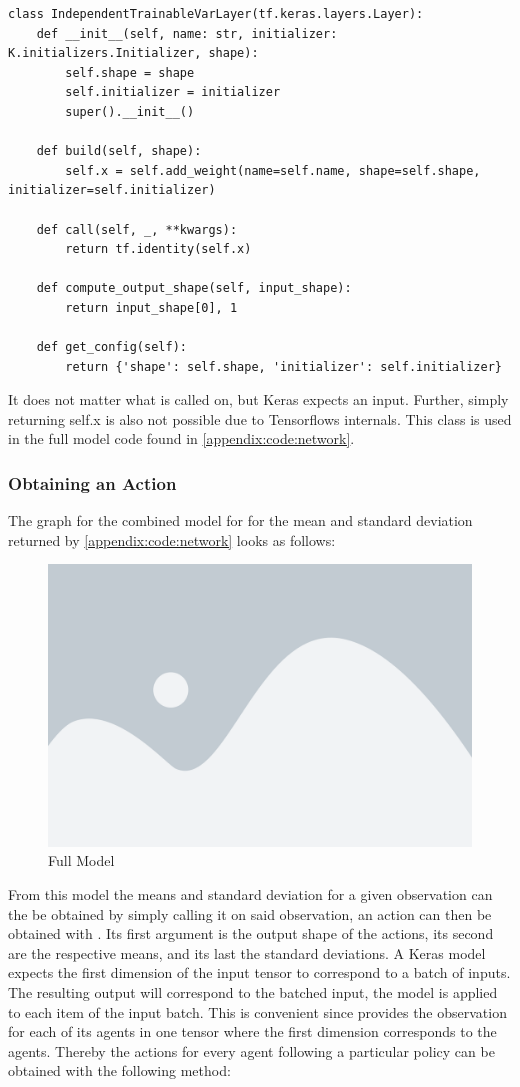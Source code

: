 \begin{lstlisting}[basicstyle=\footnotesize]
class IndependentTrainableVarLayer(tf.keras.layers.Layer):
    def __init__(self, name: str, initializer: K.initializers.Initializer, shape):
        self.shape = shape
        self.initializer = initializer
        super().__init__()

    def build(self, shape):
        self.x = self.add_weight(name=self.name, shape=self.shape, initializer=self.initializer)

    def call(self, _, **kwargs):
        return tf.identity(self.x)

    def compute_output_shape(self, input_shape):
        return input_shape[0], 1

    def get_config(self):
        return {'shape': self.shape, 'initializer': self.initializer}   
\end{lstlisting}

\noindent
It does not matter what  is called on, but Keras expects an input. Further, simply returning self.x is also not possible due to Tensorflows internals. This class is used in the full model code found in \ref{appendix:code:network}.
\subsubsection{Obtaining an Action}
The graph for the combined model for for the mean and standard deviation returned by \ref{appendix:code:network} looks as follows:

\begin{figure}[H]
    \centering
    \includegraphics[width=0.5\linewidth]{figures/placeholder.png}
    \caption{Full Model}
    \label{fig:full_model_graph}
\end{figure}

\noindent
From this model the means and standard deviation for a given observation can the be obtained by simply calling it on said observation, an action can then be obtained with . Its first argument is the output shape of the actions, its second are the respective means, and its last the standard deviations. A Keras model expects the first dimension of the input tensor to correspond to a batch of inputs. The resulting output will correspond to the batched input, the model is applied to each item of the input batch. This is convenient since  provides the observation for each of its agents in one tensor where the first dimension corresponds to the agents. Thereby the actions for every agent following a particular policy can be obtained with the following method:

